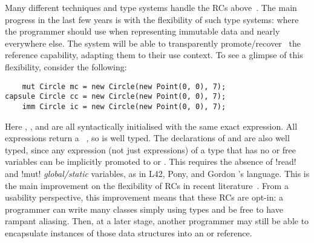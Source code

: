 \noindent Many different techniques and type systems handle the RCs above~\cite{ZibinEtAl10,ClarkeWrigstad03,HallerOdersky10,GordonEtAl12,ServettoZucca15}.
The main progress in the last few years is with the flexibility of such type systems:
 where the programmer should use \Q@imm@ when  representing immutable data
and \Q@mut@ nearly everywhere else. The system will be able to transparently promote/recover~\cite{GordonEtAl12,clebsch2015deny,ServettoZucca15} the reference capability, adapting them to their use context.
To see a glimpse of this flexibility, consider the following:
\begin{lstlisting}
    mut Circle mc = new Circle(new Point(0, 0), 7);
capsule Circle cc = new Circle(new Point(0, 0), 7);
    imm Circle ic = new Circle(new Point(0, 0), 7);
\end{lstlisting}
Here \Q@mc@, \Q@cc@, and \Q@ic@ are all syntactically initialised with the same exact expression. All
\Q@new@ expressions return a \Q@mut@~\cite{clebsch2015deny,GIANNINI2019145}, so \Q@mc@ is well typed. The declarations of \Q@cc@ and \Q@ic@ are also well typed, since 
any expression (not just \Q@new@ expressions) 
of a \Q@mut@ type that has no \Q@mut@ or \Q@read@ free 
variables can be implicitly promoted to \Q@capsule@ or \Q@imm@.
This requires the absence of \Q!read! and \Q!mut! \emph{global/static} variables, as in L42, Pony, and Gordon \etal's language.
This is the main improvement on the flexibility of RCs in recent literature~\cite{ServettoEtAl13a,ServettoZucca15,GordonEtAl12,clebsch2015deny,clebsch2017orca}.
From a usability perspective, this improvement means that
these RCs are opt-in: a programmer can write many classes
simply using \Q@mut@ types and be free to have rampant aliasing. 
Then, at a later stage, another programmer may still 
be able to encapsulate instances of those data structures into an \Q@imm@ or \Q@capsule@ reference.

